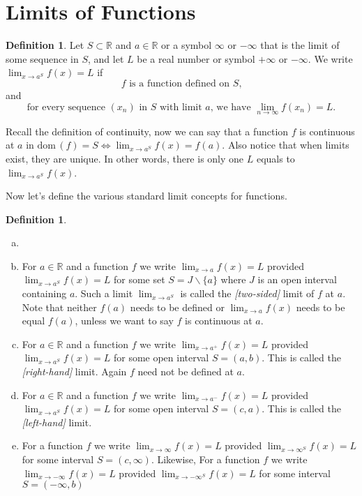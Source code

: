\documentclass[12pt, lettersize]{book}
\theoremstyle{plain}
\theoremstyle{definition}
\newtheorem{dfn}[thm]{Definition}
\theoremstyle{remark}
\newcommand{\R}{\mathbb{R}}
\newcommand{\dom}{\text{dom}\,}
\begin{document}
		\section{Limits of Functions}
			\begin{dfn}
			Let $S\subset\R$ and $a\in\R$ or a symbol $\infty$ or $-\infty$ that is the limit of some sequence in $S$, and let $L$ be a real number or symbol $+\infty$ or $-\infty$. We write $\lim_{x\rightarrow a^S} f(x)=L$ if
			\begin{displaymath}
				\text{$f$ is a function defined on $S$,}
			\end{displaymath}
			and
			\begin{displaymath}
				\text{for every sequence $(x_n)$ in $S$ with limit $a$, we have $\lim_{n\rightarrow\infty}f(x_n)=L$}.
			\end{displaymath}
			\end{dfn}
			Recall the definition of continuity, now we can say that a function $f$ is continuous at $a$ in $\dom(f)=S \iff \lim_{x\rightarrow a^S} f(x)=f(a)$. Also notice that when limits exist, they are unique. In other words, there
			is only one $L$ equals to $\lim_{x\rightarrow a^S} f(x)$.  
			
			Now let's define the various standard limit concepts for functions.
			\begin{dfn}
			\begin{enumerate}[(a)]
				\item[]
				\item For $a\in\R$ and a function $f$ we write $\lim_{x\rightarrow a}f(x)=L$ provided $\lim_{x\rightarrow a^S}f(x)=L$ for some set $S=J\backslash\{a\}$ where $J$ is an open interval containing $a$. Such a limit 
				$\lim_{x\rightarrow a^S}$ is called the \emph{[two-sided]} limit of $f$ at $a$. Note that neither $f(a)$ needs to be defined or $\lim_{x\rightarrow a}f(x)$ needs to be equal $f(a)$, unless we want to say $f$ is continuous at $a$.
				\item For $a\in\R$ and a function $f$ we write $\lim_{x\rightarrow a^+}f(x)=L$ provided $\lim_{x\rightarrow a^S}f(x)=L$ for some open interval $S=(a,b)$. This is called the \emph{[right-hand]} limit. Again $f$ need not
				be defined at $a$.
				\item For $a\in\R$ and a function $f$ we write $\lim_{x\rightarrow a^-}f(x)=L$ provided $\lim_{x\rightarrow a^S}f(x)=L$ for some open interval $S=(c,a)$. This is called the \emph{[left-hand]} limit.
				\item For a function $f$ we write $\lim_{x\rightarrow\infty}f(x)=L$ provided $\lim_{x\rightarrow\infty^S}f(x)=L$ for some interval $S=(c,\infty)$. Likewise, For a function $f$ we write $\lim_{x\rightarrow-\infty}f(x)=L$ provided $\lim_{x\rightarrow-\infty^S}f(x)=L$ for some interval $S=(-\infty,b)$
			\end{enumerate} 
			\end{dfn}
			
\end{document}
